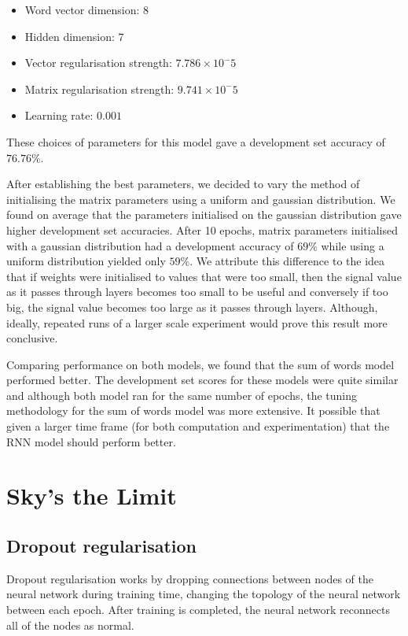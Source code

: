 \documentclass{article} %
\begin{document}
\begin{itemize}

\item Word vector dimension: $8$
\item Hidden dimension: $7$
\item Vector regularisation strength: $7.786 \times 10^-5$
\item Matrix regularisation strength: $9.741 \times 10^-5$
\item Learning rate: $0.001$

\end{itemize}

These choices of parameters for this model gave a development set accuracy of $76.76\%$.


After establishing the best parameters, we decided to vary the method of initialising the matrix parameters using a uniform and gaussian distribution. We found on average that the parameters initialised on the gaussian distribution gave higher development set accuracies. After 10 epochs, matrix parameters initialised with a gaussian distribution had a development accuracy of $69\%$ while using a uniform distribution yielded only $59\%$. We attribute this difference to the idea that if weights were initialised to values that were too small, then the signal value as it passes through layers becomes too small to be useful and conversely if too big, the signal value becomes too large as it passes through layers. Although, ideally, repeated runs of a larger scale experiment would prove this result more conclusive.

Comparing performance on both models, we found that the sum of words model performed better. The development set scores for these models were quite similar and although both model ran for the same number of epochs, the tuning methodology for the sum of words model was more extensive. It possible that given a larger time frame (for both computation and experimentation) that the RNN model should perform better.

\section{Sky's the Limit}

\subsection{Dropout regularisation}

Dropout regularisation works by dropping connections between nodes of the neural network during training time, changing the topology of the neural network between each epoch. After training is completed, the neural network reconnects all of the nodes as normal.
\end{document}
